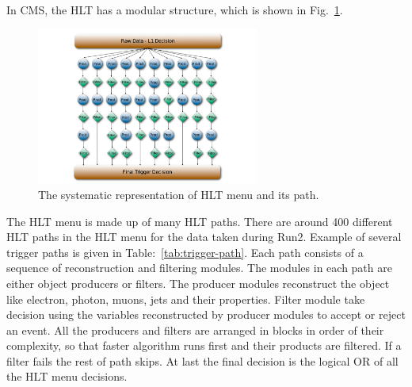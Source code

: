 In CMS, the HLT has a modular structure, which is shown in Fig.~\ref{fig:HLT_menue_workflow}.
\begin{figure}[htbp]
	\centering
	\includegraphics[width=0.65\textwidth]{figures/LHC/HLT_menu_workflow.pdf}
	\caption{The systematic representation of HLT menu and its path\cite{Perrotta2015}.}
	\label{fig:HLT_menue_workflow}
\end{figure}
The HLT menu is made up of many HLT paths. There are around 400 different HLT paths in the HLT menu for the data taken during Run2. Example of several trigger paths is given in Table:~\ref{tab:trigger-path}. Each path consists of a sequence of reconstruction and filtering modules.  The modules in each path are either object producers or filters. The producer modules reconstruct the object like electron, photon,  muons, jets and their properties. Filter module take decision using the variables reconstructed by producer modules to accept or reject an event. All the producers and filters are arranged in blocks in order of their complexity, so that faster algorithm runs first and their products are filtered. If a filter fails the rest of path skips. At last the final decision is the logical OR of all the HLT menu decisions.
